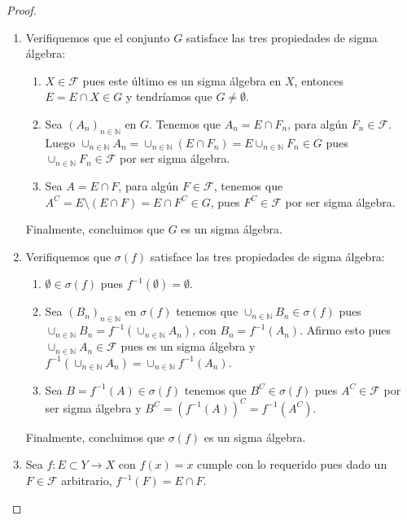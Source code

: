 \documentclass{article}
\theoremstyle{definition}
\theoremstyle{remark}
\newcommand{\BN}{\mathbb N}
\begin{document}
\begin{proof}
  \begin{enumerate}
    \item Verifiquemos que el conjunto $G$ satisface las tres propiedades de sigma \'algebra:
      \begin{enumerate}
        \item $X \in \mathcal{F}$ pues este \'ultimo es un sigma \'algebra en $X$, entonces $E = E \cap X \in G$ y tendr\'iamos que $G \neq \emptyset$.
        \item Sea $(A_n)_{n \in \BN}$ en $G$. Tenemos que $A_n = E \cap F_n$, para alg\'un $F_n \in \mathcal{F}$. Luego $\cup_{n \in \BN} A_n = \cup_{n \in \BN} (E \cap F_n) = E \cup_{n \in \BN} F_n \in G$ pues $\cup_{n \in \BN} F_n \in \mathcal{F}$ por ser sigma \'algebra.
        \item Sea $A = E \cap F$, para alg\'un $F \in \mathcal{F}$, tenemos que $A^C = E \setminus (E \cap F) = E \cap F^C \in G$, pues $F^C \in \mathcal{F}$ por ser sigma \'algebra.
      \end{enumerate}
      Finalmente, concluimos que $G$ es un sigma \'algebra.
    \item Verifiquemos que $\sigma(f)$ satisface las tres propiedades de sigma \'algebra:
      \begin{enumerate}
        \item $\emptyset \in \sigma(f)$ pues $f^{-1}(\emptyset) = \emptyset$.
        \item Sea $(B_n)_{n \in \BN}$ en $\sigma(f)$ tenemos que $\cup_{n \in \BN} B_n \in \sigma(f)$ pues $\cup_{n \in \BN} B_n = f^{-1}(\cup_{n \in \BN} A_n)$, con $B_n = f^{-1}(A_n)$. Afirmo esto pues $\cup_{n \in \BN} A_n \in \mathcal{F}$ pues es un sigma \'algebra y $f^{-1}(\cup_{n \in \BN} A_n) = \cup_{n \in \BN} f^{-1}(A_n)$.
        \item Sea $B = f^{-1}(A) \in \sigma(f)$ tenemos que $B^C \in \sigma(f)$ pues $A^C \in \mathcal{F}$ por ser sigma \'algebra y $B^C = (f^{-1}(A))^C = f^{-1}(A^C)$.
      \end{enumerate}
      Finalmente, concluimos que $\sigma(f)$ es un sigma \'algebra.
    \item Sea $f: E \subset Y \to X$ con $f(x) = x$ cumple con lo requerido pues dado un $F \in \mathcal{F}$ arbitrario, $f^{-1}(F) = E \cap F$.
  \end{enumerate}
\end{proof}
\end{document}
